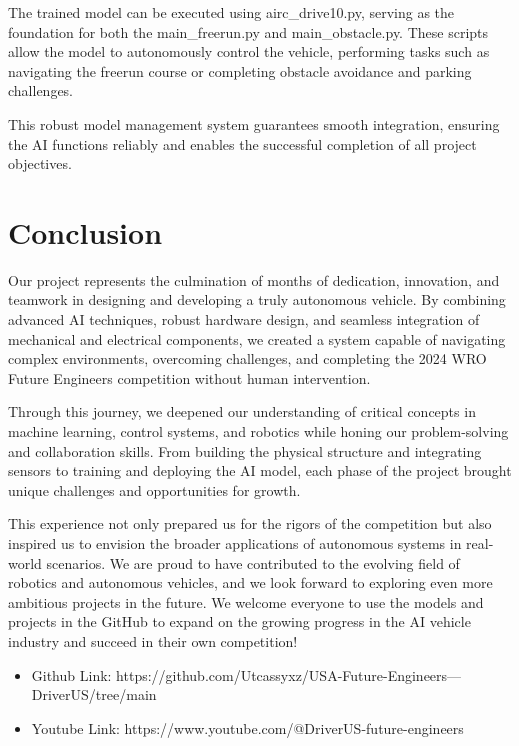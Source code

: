 \documentclass{article}
\begin{document}
\begin{multicols}{2}
The trained model can be executed using airc\_drive10.py, serving as the foundation for both the main\_freerun.py and main\_obstacle.py. These scripts allow the model to autonomously control the vehicle, performing tasks such as navigating the freerun course or completing obstacle avoidance and parking challenges.

This robust model management system guarantees smooth integration, ensuring the AI functions reliably and enables the successful completion of all project objectives.

\section{Conclusion}

Our project represents the culmination of months of dedication, innovation, and teamwork in designing and developing a truly autonomous vehicle. By combining advanced AI techniques, robust hardware design, and seamless integration of mechanical and electrical components, we created a system capable of navigating complex environments, overcoming challenges, and completing the 2024 WRO Future Engineers competition without human intervention.

Through this journey, we deepened our understanding of critical concepts in machine learning, control systems, and robotics while honing our problem-solving and collaboration skills. From building the physical structure and integrating sensors to training and deploying the AI model, each phase of the project brought unique challenges and opportunities for growth.

This experience not only prepared us for the rigors of the competition but also inspired us to envision the broader applications of autonomous systems in real-world scenarios. We are proud to have contributed to the evolving field of robotics and autonomous vehicles, and we look forward to exploring even more ambitious projects in the future. We welcome everyone to use the models and projects in the GitHub to expand on the growing progress in the AI vehicle industry and succeed in their own competition!

\begin{itemize}
    \item Github Link: https://github.com/Utcassyxz/USA-Future-Engineers---DriverUS/tree/main
    \item Youtube Link: https://www.youtube.com/@DriverUS-future-engineers
\end{itemize}

    \end{multicols}
\end{document}
